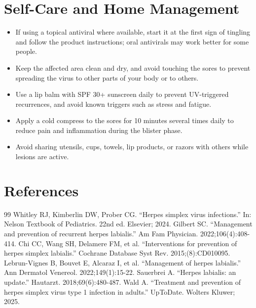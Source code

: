 \section*{Self-Care and Home Management}
\begin{itemize}
  \item If using a topical antiviral where available, start it at the first sign of tingling and follow the product instructions; oral antivirals may work better for some people.
  \item Keep the affected area clean and dry, and avoid touching the sores to prevent spreading the virus to other parts of your body or to others.
  \item Use a lip balm with SPF 30+ sunscreen daily to prevent UV-triggered recurrences, and avoid known triggers such as stress and fatigue.
  \item Apply a cold compress to the sores for 10 minutes several times daily to reduce pain and inflammation during the blister phase.
  \item Avoid sharing utensils, cups, towels, lip products, or razors with others while lesions are active.
\end{itemize}

\section*{References}
\begin{thebibliography}{99}
 Whitley RJ, Kimberlin DW, Prober CG. ``Herpes simplex virus infections.'' In: Nelson Textbook of Pediatrics. 22nd ed. Elsevier; 2024.
 Gilbert SC. ``Management and prevention of recurrent herpes labialis.'' Am Fam Physician. 2022;106(4):408-414.
 Chi CC, Wang SH, Delamere FM, et al. ``Interventions for prevention of herpes simplex labialis.'' Cochrane Database Syst Rev. 2015;(8):CD010095.
 Lebrun-Vignes B, Bouvet E, Alcaraz I, et al. ``Management of herpes labialis.'' Ann Dermatol Venereol. 2022;149(1):15-22.
 Sauerbrei A. ``Herpes labialis: an update.'' Hautarzt. 2018;69(6):480-487.
 Wald A. ``Treatment and prevention of herpes simplex virus type 1 infection in adults.'' UpToDate. Wolters Kluwer; 2025.
\end{thebibliography}
